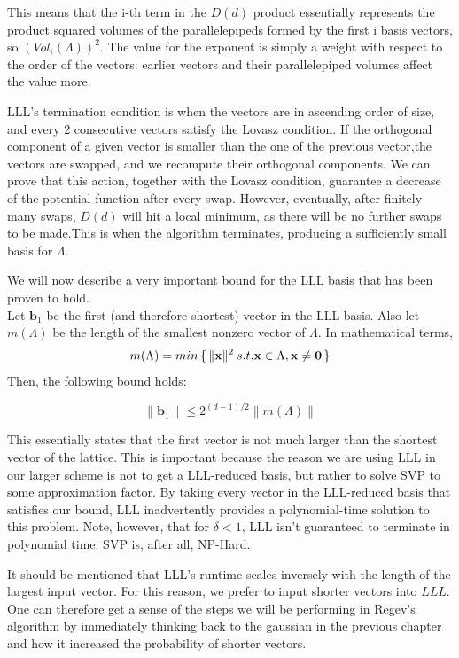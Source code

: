 This means that the i-th term in the $D(d)$ product essentially represents the product squared volumes of the parallelepipeds formed by the first i basis vectors, so $(Vol_i(\Lambda))^2$. The value for the exponent is simply a weight with respect to the order of the vectors: earlier vectors and their parallelepiped volumes affect the value more.

LLL's termination condition is when the vectors are in ascending order of size, and every 2 consecutive vectors satisfy the Lovasz condition. If the orthogonal component of a given vector is smaller than the one of the previous vector,the vectors are swapped, and we recompute their orthogonal components. We can prove that this action, together with the Lovasz condition, guarantee a decrease of the potential function after every swap. However, eventually, after finitely many swaps, $D(d)$ will hit a local minimum, as there will be no further swaps to be made.This is when the algorithm terminates, producing a sufficiently small basis for $\Lambda$.

We will now describe a very important bound for the LLL basis that has been proven to hold.\\ 
Let $\mathbf{b}_1$ be the first (and therefore shortest) vector in the LLL basis.
Also let $m(\Lambda)$ be the length of the smallest nonzero vector of $\Lambda$. In mathematical terms, $$m(\Lambda) = min\set{\lVert \mathbf{x} \rVert ^2 \: s.t. \mathbf{x} \in \Lambda, \mathbf{x} \neq \mathbf{0}}$$ Then, the following bound holds:

\begin{equation}
    \lVert \mathbf{b}_1 \rVert \leq 2^{(d-1)/2} \lVert m(\Lambda)\rVert 
    \label{eq9.3}
\end{equation}

This essentially states that the first vector is not much larger than the shortest vector of the lattice. This is important because the reason we are using LLL in our larger scheme is not to get a LLL-reduced basis, but rather to solve SVP to some approximation factor. By taking every vector in the LLL-reduced basis that satisfies our bound, LLL inadvertently provides a polynomial-time solution to this problem. Note, however, that for $\delta < 1$, LLL isn't guaranteed to terminate in polynomial time. SVP is, after all, NP-Hard.

It should be mentioned that LLL's runtime scales inversely with the length of the largest input vector. For this reason, we prefer to input shorter vectors into $LLL$. One can therefore get a sense of the steps we will be performing in Regev's algorithm by immediately thinking back to the gaussian in the previous chapter and how it increased the probability of shorter vectors.

